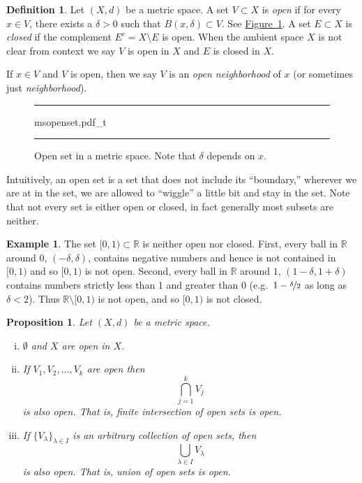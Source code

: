 \documentclass[12pt]{book}
\newenvironment{myfigureht}{%
\begin{figure}[h!t]
\noindent\rule{\textwidth}{0.4pt}\vspace{12pt}\par\centering}%
{\par\noindent\rule{\textwidth}{0.4pt}
\end{figure}}
\newcommand{\R}{{\mathbb{R}}}
\newcommand{\myindex}[1]{#1\index{#1}}
\theoremstyle{plain}
\newtheorem{prop}[thm]{Proposition}
\theoremstyle{remark}
\theoremstyle{definition}
\newtheorem{defn}[thm]{Definition}
\theoremstyle{exercise}
\theoremstyle{example}
\newtheorem{example}[thm]{Example}
\newcommand{\figureref}[1]{\hyperref[#1]{Figure~\ref*{#1}}}
\begin{document}
\begin{defn}
Let $(X,d)$ be a metric space.  A set $V \subset X$
is \emph{open}
if for every $x \in V$, there exists a $\delta > 0$ such that
$B(x,\delta) \subset V$.  See \figureref{fig:msopenset}.  A set $E \subset X$ is 
\emph{closed} if the complement $E^c = X \setminus E$ is open.
When the ambient space $X$ is not clear from context we say
$V$ is open in $X$ and $E$ is closed in $X$.

If $x \in V$ and $V$ is open, then we say 
$V$ is an \emph{\myindex{open neighborhood}} of $x$ (or
sometimes just \emph{\myindex{neighborhood}}).
\end{defn}

\begin{myfigureht}
{msopenset.pdf_t}
\caption{Open set in a metric space.  Note that $\delta$ depends on $x$.\label{fig:msopenset}}
\end{myfigureht}

Intuitively, an open set is a set that does not include its ``boundary,''
wherever we are at in the set, we are allowed to ``wiggle'' a little bit and
stay in the set.
Note that not every set is either open or closed, in fact generally
most subsets are neither.

\begin{example}
The set $[0,1) \subset \R$ is neither open nor closed.  First,
every ball in $\R$ around $0$, $(-\delta,\delta)$, contains negative
numbers and hence is not contained in $[0,1)$ and so $[0,1)$ is not open.
Second, every ball in $\R$ around $1$, $(1-\delta,1+\delta)$ contains
numbers strictly less than 1 and greater than 0
(e.g.\ $1-\nicefrac{\delta}{2}$ as long as $\delta < 2$).
Thus $\R \setminus
[0,1)$ is not open, and so $[0,1)$ is not closed.
\end{example}

\begin{prop} \label{prop:topology:open}
Let $(X,d)$ be a metric space.
\begin{enumerate}[(i)]
\item \label{topology:openi} $\emptyset$ and $X$ are open in $X$.
\item \label{topology:openii} If $V_1, V_2, \ldots, V_k$ are open then
\begin{equation*}
\bigcap_{j=1}^k V_j
\end{equation*}
is also open.  That is, finite intersection of open sets is open.
\item \label{topology:openiii} If $\{ V_\lambda \}_{\lambda \in I}$ is
an arbitrary collection of open sets, then
\begin{equation*}
\bigcup_{\lambda \in I} V_\lambda
\end{equation*}
is also open.  That is, union of open sets is open.
\end{enumerate}
\end{prop}
\end{document}
